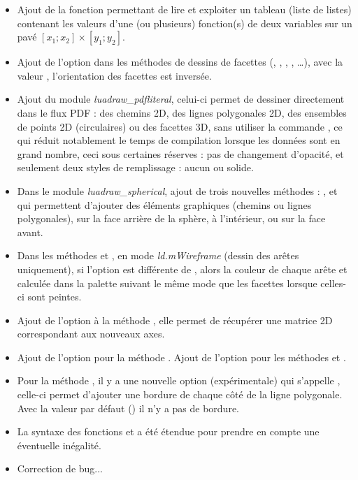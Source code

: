\begin{itemize}
    \item Ajout de la fonction  permettant de lire et exploiter un tableau (liste de listes) contenant les valeurs d'une (ou plusieurs) fonction(s) de deux variables sur un pavé $[x_1;x_2]\times [y_1;y_2]$.

    \item Ajout de l'option  dans les méthodes de dessins de facettes (, , , , \ldots), avec la valeur \true, l'orientation des facettes est inversée.

    \item Ajout du module \emph{luadraw\_pdfliteral}, celui-ci permet de dessiner directement dans le flux PDF : des chemins 2D, des lignes polygonales 2D, des ensembles de points 2D (circulaires) ou des facettes 3D, sans utiliser la commande \drawcmd, ce qui réduit notablement le temps de compilation lorsque les données sont en grand nombre, ceci sous certaines réserves : pas de changement d'opacité, et seulement deux styles de remplissage : aucun ou solide.
    
    \item Dans le module \emph{luadraw\_spherical}, ajout de trois nouvelles méthodes : ,  et  qui permettent d'ajouter des éléments graphiques (chemins ou lignes polygonales), sur la face arrière de la sphère, à l'intérieur, ou sur la face avant.

    \item Dans les méthodes  et , en mode \emph{ld.mWireframe} (dessin des arêtes uniquement), si l'option  est différente de \nil, alors la couleur de chaque arête et calculée dans la palette suivant le même mode que les facettes lorsque celles-ci sont peintes.
    
    \item Ajout de l'option  à la méthode ,  elle permet de récupérer une matrice 2D correspondant aux nouveaux axes.
    
    \item Ajout de l'option  pour la méthode . Ajout de l'option  pour les méthodes  et .
    
    \item Pour la méthode , il y a une nouvelle option (expérimentale) qui s'appelle , celle-ci permet d'ajouter une bordure de chaque côté de la ligne polygonale. Avec la valeur par défaut (\nil) il n'y a pas de bordure. 
    
    \item La syntaxe des fonctions  et  a été étendue pour prendre en compte une éventuelle inégalité.
    
    \item Correction de bug...
\end{itemize}

